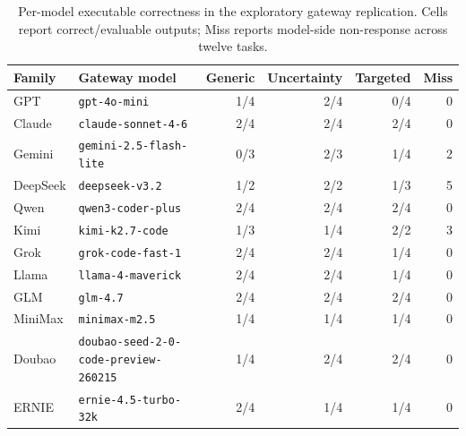 \begin{table}[t]
\centering
\small
\caption{Per-model executable correctness in the exploratory gateway replication. Cells report correct/evaluable outputs; Miss reports model-side non-response across twelve tasks.}
\label{tab:gateway_agent_models}
\begin{tabular}{llrrrr}
\toprule
Family & Gateway model & Generic & Uncertainty & Targeted & Miss \\
\midrule
GPT & \texttt{gpt-4o-mini} & 1/4 & 2/4 & 0/4 & 0 \\
Claude & \texttt{claude-sonnet-4-6} & 2/4 & 2/4 & 2/4 & 0 \\
Gemini & \texttt{gemini-2.5-flash-lite} & 0/3 & 2/3 & 1/4 & 2 \\
DeepSeek & \texttt{deepseek-v3.2} & 1/2 & 2/2 & 1/3 & 5 \\
Qwen & \texttt{qwen3-coder-plus} & 2/4 & 2/4 & 2/4 & 0 \\
Kimi & \texttt{kimi-k2.7-code} & 1/3 & 1/4 & 2/2 & 3 \\
Grok & \texttt{grok-code-fast-1} & 2/4 & 2/4 & 1/4 & 0 \\
Llama & \texttt{llama-4-maverick} & 2/4 & 2/4 & 1/4 & 0 \\
GLM & \texttt{glm-4.7} & 2/4 & 2/4 & 2/4 & 0 \\
MiniMax & \texttt{minimax-m2.5} & 1/4 & 1/4 & 1/4 & 0 \\
Doubao & \texttt{doubao-seed-2-0-code-preview-260215} & 1/4 & 2/4 & 2/4 & 0 \\
ERNIE & \texttt{ernie-4.5-turbo-32k} & 2/4 & 1/4 & 1/4 & 0 \\
\bottomrule
\end{tabular}
\end{table}
